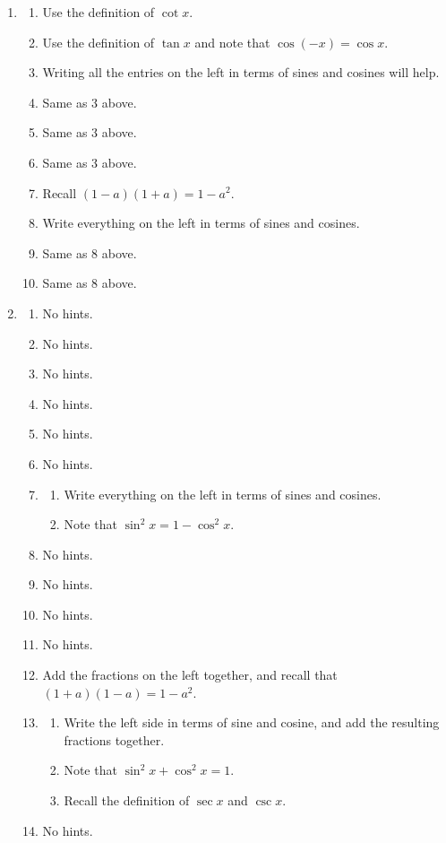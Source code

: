 \documentclass[english]{book}
\begin{document}
\begin{enumerate}

  \item \begin{enumerate}  %
    \item Use the definition of $\cot x$.
    \item Use the definition of $\tan x$ and note that $\cos(-x) = \cos x$.
    \item Writing all the entries on the left in terms of sines and cosines will help.
    \item Same as 3 above.
    \item Same as 3 above.
    \item Same as 3 above.
    \item Recall $(1-a)(1+a) = 1 - a^2$.
    \item Write everything on the left in terms of sines and cosines.
    \item Same as 8 above.
    \item Same as 8 above.
    \end{enumerate}

  \item \begin{enumerate}  %
    \item No hints.
    \item No hints.
    \item No hints.
    \item No hints.
    \item No hints.
    \item No hints.
    \item \begin{enumerate}[\hspace{1cm}a)]
            \item Write everything on the left in terms of sines and cosines.
            \item Note that $\sin^{2} x = 1 - \cos^{2} x$.
          \end{enumerate}
    \item No hints.
    \item No hints.
    \item No hints.
    \item No hints.
    \item Add the fractions on the left together, and recall that $(1+a)(1-a)= 1-a^2$.
    \item \begin{enumerate}[\hspace{1cm}a)]
            \item Write the left side in terms of sine and cosine, and add the resulting fractions together.
            \item Note that $\sin^{2} x + \cos^{2} x = 1$.
            \item Recall the definition of $\sec x$ and $\csc x$.
          \end{enumerate}
    \item No hints.


\end{enumerate}
\end{enumerate}
\end{document}

